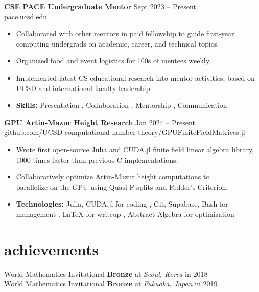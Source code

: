 \documentclass[11pt]{article}
\newcommand{\entry}[3]{{{\textbf{#1}}} \hfill #2 \\ #3 \hfill \hspace{0em}}
\renewcommand{\>}{,}
\begin{document}
\begin{paracol}{2}
\entry{CSE PACE Undergraduate Mentor}{Sept 2023 -- Present}
{\href{https://pace.ucsd.edu/}{\footnotesize pace.ucsd.edu \normalsize}}
\begin{itemize}[noitemsep,leftmargin=3.5mm,rightmargin=0mm,topsep=3pt]
    \item Collaborated with other mentors in paid fellowship to guide first-year computing undergrads on academic, career, and technical topics.
    \item Organized food and event logistics for 100s of mentees weekly.
    \item Implemented latest CS educational research into mentor activities, based on UCSD and international faculty leadership.
    \item \textbf{Skills:} Presentation \> Collaboration \> Mentorship \> Communication
\end{itemize}
\medskip

\entry{GPU Artin-Mazur Height Research}{Jan 2024 -- Present}
{\href{https://github.com/UCSD-computational-number-theory/GPUFiniteFieldMatrices.jl}{\footnotesize github.com/UCSD-computational-number-theory/GPUFiniteFieldMatrices.jl \normalsize}}
\begin{itemize}[noitemsep,leftmargin=3.5mm,rightmargin=0mm,topsep=3pt]
    \item Wrote first open-source Julia and CUDA.jl finite field linear algebra library, 1000 times faster than previous C implementations.
    \item Collaboratively optimize Artin-Mazur height computations to \\ parallelize on the GPU using Quasi-F splits and Fedder's Criterion.
    \item \textbf{Technologies:} Julia, CUDA.jl for coding \> Git, Supabase, Bash for management \> LaTeX for writeup \> Abstract Algebra for optimization
\end{itemize}

\section{achievements}
\begin{flushleft}
    World Mathematics Invitational
    \textbf{Bronze} at \emph{Seoul, Korea} in 2018 \\
    World Mathematics Invitational
    \textbf{Bronze} at \emph{Fukuoka, Japan} in 2019
\end{flushleft}

\switchcolumn


\end{paracol}
\end{document}
